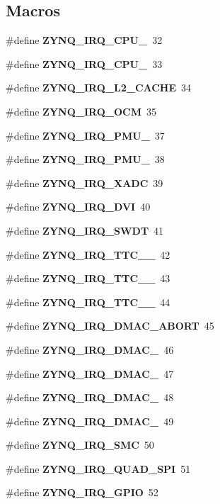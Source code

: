 \subsection*{Macros}
\begin{DoxyCompactItemize}
\item 
\#define {\bfseries Z\+Y\+N\+Q\+\_\+\+I\+R\+Q\+\_\+\+C\+P\+U\+\_}~32
\item 
\#define {\bfseries Z\+Y\+N\+Q\+\_\+\+I\+R\+Q\+\_\+\+C\+P\+U\+\_}~33
\item 
\#define {\bfseries Z\+Y\+N\+Q\+\_\+\+I\+R\+Q\+\_\+\+L2\+\_\+\+C\+A\+C\+HE}~34
\item 
\#define {\bfseries Z\+Y\+N\+Q\+\_\+\+I\+R\+Q\+\_\+\+O\+CM}~35
\item 
\#define {\bfseries Z\+Y\+N\+Q\+\_\+\+I\+R\+Q\+\_\+\+P\+M\+U\+\_}~37
\item 
\#define {\bfseries Z\+Y\+N\+Q\+\_\+\+I\+R\+Q\+\_\+\+P\+M\+U\+\_}~38
\item 
\#define {\bfseries Z\+Y\+N\+Q\+\_\+\+I\+R\+Q\+\_\+\+X\+A\+DC}~39
\item 
\#define {\bfseries Z\+Y\+N\+Q\+\_\+\+I\+R\+Q\+\_\+\+D\+VI}~40
\item 
\#define {\bfseries Z\+Y\+N\+Q\+\_\+\+I\+R\+Q\+\_\+\+S\+W\+DT}~41
\item 
\#define {\bfseries Z\+Y\+N\+Q\+\_\+\+I\+R\+Q\+\_\+\+T\+T\+C\+\_\+\_}~42
\item 
\#define {\bfseries Z\+Y\+N\+Q\+\_\+\+I\+R\+Q\+\_\+\+T\+T\+C\+\_\+\_}~43
\item 
\#define {\bfseries Z\+Y\+N\+Q\+\_\+\+I\+R\+Q\+\_\+\+T\+T\+C\+\_\+\_}~44
\item 
\#define {\bfseries Z\+Y\+N\+Q\+\_\+\+I\+R\+Q\+\_\+\+D\+M\+A\+C\+\_\+\+A\+B\+O\+RT}~45
\item 
\#define {\bfseries Z\+Y\+N\+Q\+\_\+\+I\+R\+Q\+\_\+\+D\+M\+A\+C\+\_}~46
\item 
\#define {\bfseries Z\+Y\+N\+Q\+\_\+\+I\+R\+Q\+\_\+\+D\+M\+A\+C\+\_}~47
\item 
\#define {\bfseries Z\+Y\+N\+Q\+\_\+\+I\+R\+Q\+\_\+\+D\+M\+A\+C\+\_}~48
\item 
\#define {\bfseries Z\+Y\+N\+Q\+\_\+\+I\+R\+Q\+\_\+\+D\+M\+A\+C\+\_}~49
\item 
\#define {\bfseries Z\+Y\+N\+Q\+\_\+\+I\+R\+Q\+\_\+\+S\+MC}~50
\item 
\#define {\bfseries Z\+Y\+N\+Q\+\_\+\+I\+R\+Q\+\_\+\+Q\+U\+A\+D\+\_\+\+S\+PI}~51
\item 
\#define {\bfseries Z\+Y\+N\+Q\+\_\+\+I\+R\+Q\+\_\+\+G\+P\+IO}~52

\end{DoxyCompactItemize}
